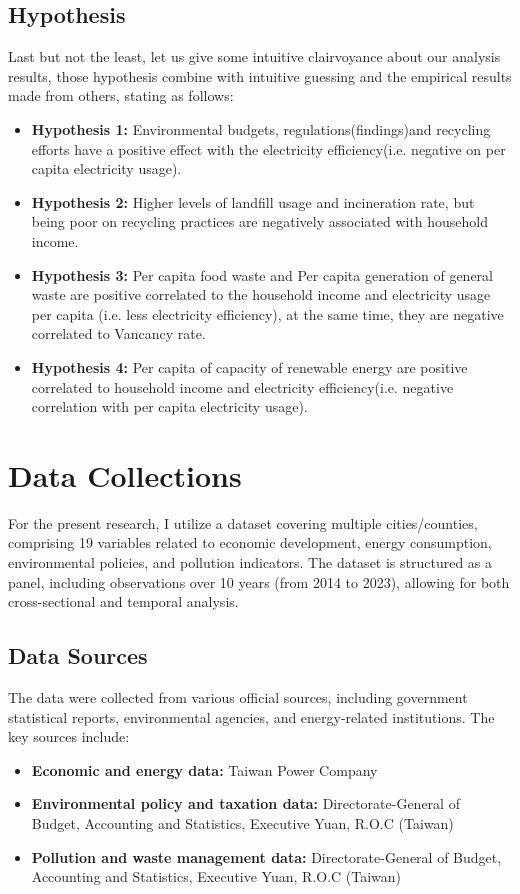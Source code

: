 \documentclass{article}
\begin{document}
\subsection{Hypothesis}
Last but not the least, let us give some intuitive clairvoyance about our analysis results, those hypothesis combine with intuitive guessing and the empirical results made from others, stating as follows:
\begin{itemize}
    \item \textbf{Hypothesis 1: }Environmental budgets, regulations(findings)and recycling efforts have a positive effect with the electricity efficiency(i.e. negative on per capita electricity usage).
    \item \textbf{Hypothesis 2: }Higher levels of landfill usage and incineration rate, but being poor on recycling practices are negatively associated with household income.
    \item \textbf{Hypothesis 3: }Per capita food waste and Per capita generation of general waste are positive correlated to the household income and electricity usage per capita (i.e. less electricity efficiency), at the same time, they are negative correlated to Vancancy rate. 
    \item \textbf{Hypothesis 4: }Per capita of capacity of renewable energy are positive correlated to household income and electricity efficiency(i.e. negative correlation with per capita electricity usage).
\end{itemize}





\section{Data Collections}
For the present research, I utilize a dataset covering multiple cities/counties, comprising 19 variables related to economic development, energy consumption, environmental policies, and pollution indicators. The dataset is structured as a panel, including observations over 10 years (from 2014 to 2023), allowing for both cross-sectional and temporal analysis.
\subsection{Data Sources}
The data were collected from various official sources, including government statistical reports, environmental agencies, and energy-related institutions. The key sources include:
\begin{itemize}
    \item \textbf{Economic and energy data:} Taiwan Power Company
    \item \textbf{Environmental policy and taxation data:} Directorate-General of Budget, Accounting and Statistics, Executive Yuan, R.O.C (Taiwan)
    \item \textbf{Pollution and waste management data:} Directorate-General of Budget, Accounting and Statistics, Executive Yuan, R.O.C (Taiwan)
\end{itemize}
\end{document}
